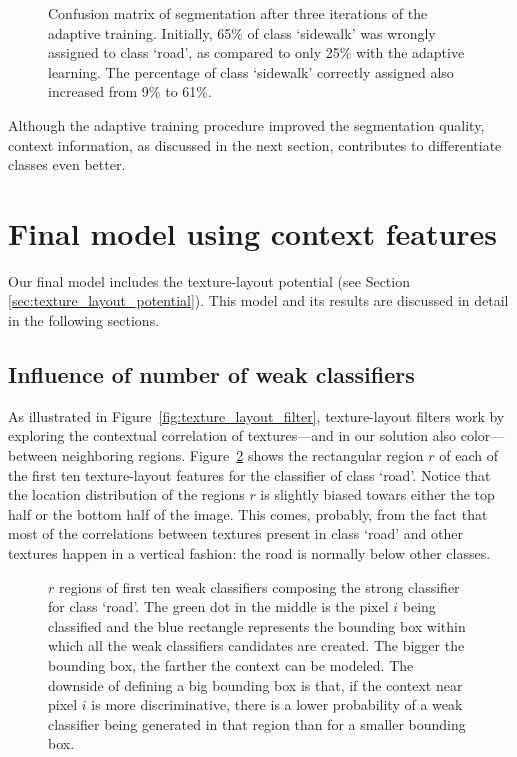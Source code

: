 \begin{figure}[htb]
\caption[Confusion matrix after adaptive training]{Confusion matrix of segmentation after three iterations of the adaptive training. Initially, 65\% of class `sidewalk' was wrongly assigned to class `road', as compared to only 25\% with the adaptive learning. The percentage of class `sidewalk' correctly assigned also increased from 9\% to 61\%.}
\label{fig:confusion_with_weight}
\end{figure}

Although the adaptive training procedure improved the segmentation quality, context information, as discussed in the next section, contributes to differentiate classes even better.

\section{Final model using context features}

Our final model includes the texture-layout potential (see Section \ref{sec:texture_layout_potential}). This model and its results are discussed in detail in the following sections.

\subsection{Influence of number of weak classifiers} \label{sec:boosting_accuracy}

As illustrated in Figure~\ref{fig:texture_layout_filter}, texture-layout filters work by exploring the contextual correlation of textures---and in our solution also color---between neighboring regions. Figure~\ref{fig:texture_layout_example_regions} shows the rectangular region $r$ of each of the first ten texture-layout features for the classifier of class `road'. Notice that the location distribution of the regions $r$ is slightly biased towars either the top half or the bottom half of the image. This comes, probably, from the fact that most of the correlations between textures present in class `road' and other textures happen in a vertical fashion: the road is normally below other classes.

\begin{figure}[htb]
\caption[Example of texture-layout features]{$r$ regions of first ten weak classifiers composing the strong classifier for class `road'. The green dot in the middle is the pixel $i$ being classified and the blue rectangle represents the bounding box within which all the weak classifiers candidates are created. The bigger the bounding box, the farther the context can be modeled. The downside of defining a big bounding box is that, if the context near pixel $i$ is more discriminative, there is a lower probability of a weak classifier being generated in that region than for a smaller bounding box.}
\label{fig:texture_layout_example_regions}
\end{figure}

